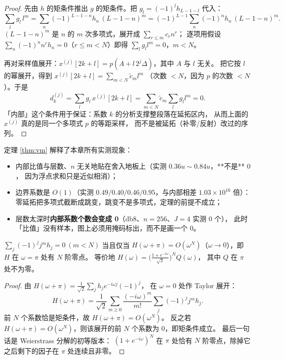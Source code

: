 \begin{proof}
先由 $h$ 的矩条件推出 $g$ 的矩条件。把 $g_l=(-1)^lh_{L-1-l}$ 代入：
\[
\sum_l g_l\,l^m=\sum_n(-1)^{L-1-n}h_n\,(L-1-n)^m
=(-1)^{L-1}\sum_n(-1)^nh_n\,(L-1-n)^m .
\]
$(L-1-n)^m$ 是 $n$ 的 $m$ 次多项式，展开成 $\sum_{r\le m}c_rn^r$；
逐项用假设 $\sum_n(-1)^nn^rh_n=0$（$r\le m<N$）即得 $\sum_lg_l l^m=0$，$m<N$。

再对采样值展开：$x^{(j)}[2k+l]=p(A+l\,2^j\Delta)$，其中 $A$ 与 $l$ 无关。
把它按 $l$ 的幂展开，得到 $x^{(j)}[2k+l]=\sum_{m<N}\tilde c_m l^m$
（次数 $<N$，因为 $p$ 的次数 $<N$）。于是
\[
d^{(j)}_k=\sum_l g_l\,x^{(j)}[2k+l]=\sum_{m<N}\tilde c_m\sum_lg_l l^m=0 .
\]
「内部」这个条件用于保证：系数 $k$ 的分析支撑整段落在延拓区内，
从而上面的 $x^{(j)}$ 真的是同一个多项式 $p$ 的等距采样，
而不是被延拓（补零/反射）改过的序列。
\end{proof}

定理 \ref{thm:vm} 解释了本章所有实测现象：

\begin{itemize}
  \item 内部比值与层数、$n$ 无关地贴在舍入地板上（实测 $0.36u\sim0.84u$，**不是** $0$，
        因为浮点求和只是近似相消）；
  \item 边界系数是 $O(1)$（实测 $0.49/0.40/0.46/0.95$，与内部相差 $1.03\times10^{16}$ 倍）：
        零延拓把多项式截断成跳变，跳变不是多项式，定理的前提不成立；
  \item 层数太深时\textbf{内部系数个数会变成 0}（db8、$n=256$、$J=4$ 实测 $0$ 个），
        此时「比值」没有样本，图上必须用掩码标出，而不是画一个 $0$。
\end{itemize}

\begin{theorem}[$H$ 在 $\pi$ 处的 $N$ 阶零点]
\label{thm:zero}
$\sum_j(-1)^jj^mh_j=0\ (m<N)$ 当且仅当
$H(\omega+\pi)=O(\omega^N)$（$\omega\to0$），即 $H$ 在 $\omega=\pi$ 处有 $N$ 阶零点。
等价地 $H(\omega)=\big(\tfrac{1+e^{-i\omega}}{\sqrt2}\big)^NQ(\omega)$，
其中 $Q$ 在 $\pi$ 处不为零。
\end{theorem}

\begin{proof}
由 $H(\omega+\pi)=\frac1{\sqrt2}\sum_jh_je^{-i\omega j}(-1)^j$，
在 $\omega=0$ 处作 Taylor 展开：
\[
H(\omega+\pi)=\frac1{\sqrt2}\sum_{m\ge0}\frac{(-i\omega)^m}{m!}\sum_j(-1)^jj^mh_j .
\]
前 $N$ 个系数恰是矩条件，故 $H(\omega+\pi)=O(\omega^N)$。
反之若 $H(\omega+\pi)=O(\omega^N)$，则该展开的前 $N$ 个系数为 $0$，即矩条件成立。
最后一句话是 Weierstrass 分解的初等版本：
$(1+e^{-i\omega})^N$ 在 $\pi$ 处恰有 $N$ 阶零点，除掉它之后剩下的因子在 $\pi$ 处连续且非零。
\end{proof}

